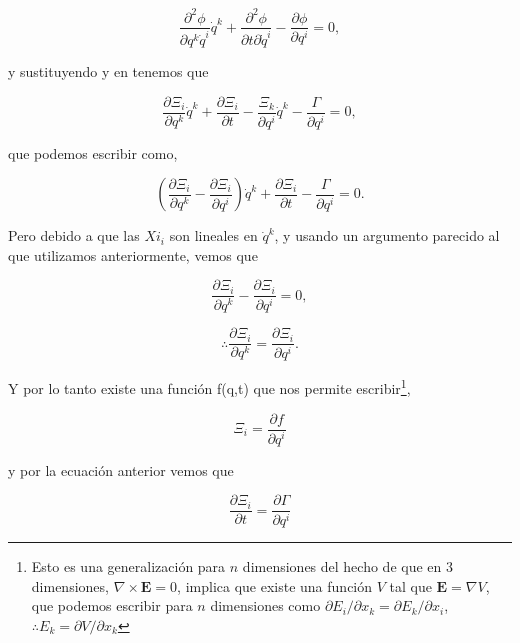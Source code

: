 \documentclass[a4paper,10pt]{article}
\numberwithin{equation}{section}
\begin{document}
\begin{equation}
 \frac{\partial^2 \phi}{\partial q^k \dot{q}^i} \dot{q}^k + \frac{\partial^2 \phi}{\partial t \partial \dot{q}^i}  
 - \frac{\partial \phi}{\partial q^i} = 0,
 \label{eq:4cero1}
\end{equation}

y sustituyendo  y  en  tenemos que

\begin{equation}
 \frac{\partial \Xi_i}{\partial q^k} \dot{q}^k + \frac{\partial \Xi_i}{\partial t}
- \frac{\Xi_k}{\partial q^i}\dot{q}^k - \frac{\Gamma}{\partial q^i} = 0,
\end{equation}

que podemos escribir como,

\begin{equation}
 \left( \frac{\partial \Xi_i}{\partial q^k} - \frac{\partial \Xi_i}{\partial q^i}\right) \dot{q}^k
 + \frac{\partial \Xi_i}{\partial t} - \frac{\Gamma}{\partial q^i} = 0.
\end{equation}

Pero debido a que las $Xi_i$ son lineales en $\dot{q}^k$, y usando un argumento 
parecido al que utilizamos anteriormente, vemos que 

\begin{equation}
 \frac{\partial \Xi_i}{\partial q^k} - \frac{\partial \Xi_i}{\partial q^i} = 0,
\end{equation}

\begin{equation}
 \therefore \frac{\partial \Xi_i}{\partial q^k} = \frac{\partial \Xi_i}{\partial q^i}.
\end{equation}

Y por lo tanto existe una función f(q,t) que nos permite escribir\footnote{Esto es una 
generalización para $n$ dimensiones del hecho de que en 3 dimensiones, $\nabla \times \mathbf{E} = 0$,
implica que existe una función $V$ tal que $\mathbf{E} = \nabla V$, que podemos escribir para 
$n$ dimensiones como $\partial E_i / \partial x_k = \partial E_k / \partial x_i$, 
$\therefore E_k = \partial V / \partial x_k$},

\begin{equation}
 \Xi_i = \frac{\partial f}{\partial q^i}
 \label{eq:4xi2}
\end{equation}

y por la ecuación anterior vemos que 

\begin{equation}
 \frac{\partial \Xi_i}{\partial t} = \frac{\partial \Gamma}{\partial q^i}
\end{equation}
\end{document}
